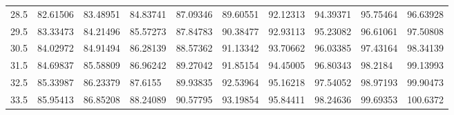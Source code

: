 \documentclass[10pt,twocolumn,letterpaper]{article}
\begin{document}
\begin{table}
{\begin{tabular}{llllllllll}
    28.5            & 82.61506                               & 83.48951                               & 84.83741                                & 87.09346                                & 89.60551                                & 92.12313                                & 94.39371                                & 95.75464                                & 96.63928                                \\
    29.5            & 83.33473                               & 84.21496                               & 85.57273                                & 87.84783                                & 90.38477                                & 92.93113                                & 95.23082                                & 96.61061                                & 97.50808                                \\
    30.5            & 84.02972                               & 84.91494                               & 86.28139                                & 88.57362                                & 91.13342                                & 93.70662                                & 96.03385                                & 97.43164                                & 98.34139                                \\
    31.5            & 84.69837                               & 85.58809                               & 86.96242                                & 89.27042                                & 91.85154                                & 94.45005                                & 96.80343                                & 98.2184                                 & 99.13993                                \\
    32.5            & 85.33987                               & 86.23379                               & 87.6155                                 & 89.93835                                & 92.53964                                & 95.16218                                & 97.54052                                & 98.97193                                & 99.90473                                \\
    33.5            & 85.95413                               & 86.85208                               & 88.24089                                & 90.57795                                & 93.19854                                & 95.84411                                & 98.24636                                & 99.69353                                & 100.6372                                \\

\end{tabular}}
\end{table}
\end{document}

